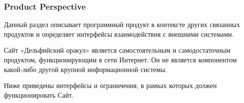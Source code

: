 \subsubsection{Product Perspective}

Данный раздел описывает программный продукт в контексте других связанных продуктов и определяет интерфейсы взаимодействия с внешними системами.

Сайт «Дельфийский оракул» является самостоятельным и самодостаточным продуктом, функционирующим в сети Интернет. Он не является компонентом какой-либо другой крупной информационной системы.

Ниже приведены интерфейсы и ограничения, в рамках которых должен функционировать Сайт.







